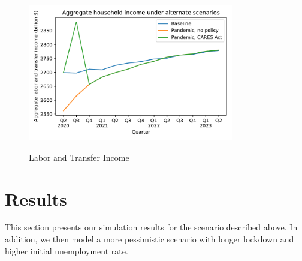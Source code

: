 \documentclass[titlepage,a4paper]{\econtex}
\begin{document}
\begin{figure}
  \centering
  \caption{Labor and Transfer Income}
  \label{labor_income}
  { \includegraphics[width=0.8\textwidth]{./Figures/AggLT}}
\end{figure}


\section{Results}

This section presents our simulation results for the scenario described above. In addition, we then model a more pessimistic scenario with longer lockdown and higher initial unemployment rate.
\end{document}
